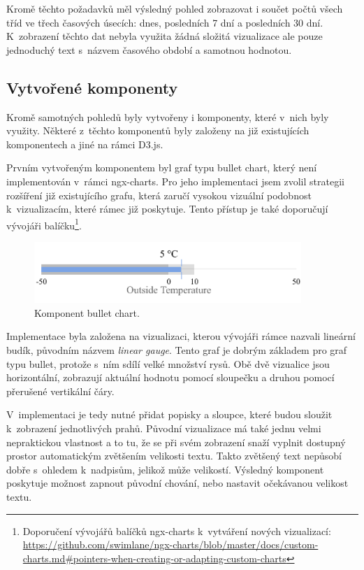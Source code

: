Kromě těchto požadavků měl výsledný pohled zobrazovat i součet počtů všech tříd ve třech časových úsecích: dnes, posledních 7 dní a posledních 30 dní. K~zobrazení těchto dat nebyla využita žádná složitá vizualizace ale pouze jednoduchý text s~názvem časového období a samotnou hodnotou.

\subsection{Vytvořené komponenty}
Kromě samotných pohledů byly vytvořeny i komponenty, které v~nich byly využity. Některé z~těchto komponentů byly založeny na již existujících komponentech a jiné na rámci D3.js.

Prvním vytvořeným komponentem byl graf typu bullet chart, který není implementován v~rámci ngx-charts. Pro jeho implementaci jsem zvolil strategii rozšíření již existujícího grafu, která zaručí vysokou vizuální podobnost k~vizualizacím, které rámec již poskytuje. Tento přístup je také doporučují vývojáři balíčku\footnote{Doporučení vývojářů balíčků ngx-charts k~vytváření nových vizualizací: \url{https://github.com/swimlane/ngx-charts/blob/master/docs/custom-charts.md\#pointers-when-creating-or-adapting-custom-charts}}.

\begin{figure}[H]
\label{question4}
\begin{center}
    \includegraphics[width=0.9\textwidth]{obrazky-figures/bulletChart.pdf}
\end{center}
\caption{Komponent bullet chart.}
\end{figure}

Implementace byla založena na vizualizaci, kterou vývojáři rámce nazvali lineární budík, původním názvem \textit{linear gauge}. Tento graf je dobrým základem pro graf typu bullet, protože s~ním sdílí velké množství rysů. Obě dvě vizualice jsou horizontální, zobrazují aktuální hodnotu pomocí sloupečku a druhou pomocí přerušené vertikální čáry. 

V~implementaci je tedy nutné přidat popisky a sloupce, které budou sloužit k~zobrazení jednotlivých prahů. Původní vizualizace má také jednu velmi nepraktickou vlastnost a to tu, že se při svém zobrazení snaží vyplnit dostupný prostor automatickým zvětšením velikosti textu. Takto zvětšený text nepůsobí dobře s~ohledem k~nadpisům, jelikož může velikostí. Výsledný komponent poskytuje možnost zapnout původní chování, nebo nastavit očekávanou velikost textu.

